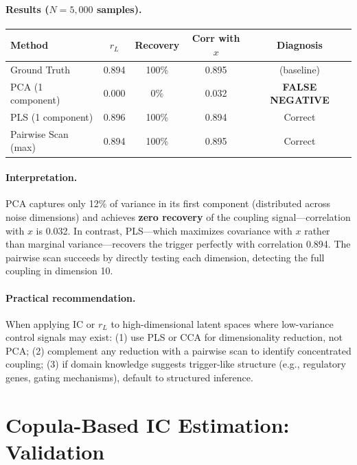 \documentclass[10pt]{article} %
\theoremstyle{plain}
\theoremstyle{definition}
\begin{document}
\paragraph{Results ($N = 5{,}000$ samples).}

\begin{center}
\begin{tabular}{lcccc}
\toprule
\textbf{Method} & \textbf{$r_L$} & \textbf{Recovery} & \textbf{Corr with $x$} & \textbf{Diagnosis} \\
\midrule
Ground Truth & 0.894 & 100\% & 0.895 & (baseline) \\
PCA (1 component) & 0.000 & 0\% & 0.032 & \textbf{FALSE NEGATIVE} \\
PLS (1 component) & 0.896 & 100\% & 0.894 & Correct \\
Pairwise Scan (max) & 0.894 & 100\% & 0.895 & Correct \\
\bottomrule
\end{tabular}
\end{center}

\paragraph{Interpretation.} PCA captures only 12\% of variance in its first component (distributed across noise dimensions) and achieves \textbf{zero recovery} of the coupling signal---correlation with $x$ is 0.032. In contrast, PLS---which maximizes covariance with $x$ rather than marginal variance---recovers the trigger perfectly with correlation 0.894. The pairwise scan succeeds by directly testing each dimension, detecting the full coupling in dimension 10.

\paragraph{Practical recommendation.} When applying IC or $r_L$ to high-dimensional latent spaces where low-variance control signals may exist: (1) use PLS or CCA for dimensionality reduction, not PCA; (2) complement any reduction with a pairwise scan to identify concentrated coupling; (3) if domain knowledge suggests trigger-like structure (e.g., regulatory genes, gating mechanisms), default to structured inference.

\section{Copula-Based IC Estimation: Validation}
\label{app:copula}
\end{document}
